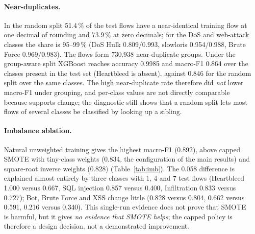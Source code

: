 \documentclass[11pt,a4paper]{article}
\begin{document}
\paragraph{Near-duplicates.} In the random split 51.4\,\% of the test flows have a near-identical training flow at one decimal of rounding and 73.9\,\% at zero decimals; for the DoS and web-attack classes the share is 95--99\,\% (DoS Hulk 0.809/0.993, slowloris 0.954/0.988, Brute Force 0.969/0.983). The flows form 730{,}938 near-duplicate groups. Under the group-aware split XGBoost reaches accuracy 0.9985 and macro-F1 0.864 over the classes present in the test set (Heartbleed is absent), against 0.846 for the random split over the same classes. The high near-duplicate rate therefore did \emph{not} lower macro-F1 under grouping, and per-class values are not directly comparable because supports change; the diagnostic still shows that a random split lets most flows of several classes be classified by looking up a sibling.

\paragraph{Imbalance ablation.} Natural unweighted training gives the highest macro-F1 (0.892), above capped SMOTE with tiny-class weights (0.834, the configuration of the main results) and square-root inverse weights (0.828) (Table~\ref{tab:imb}). The 0.058 difference is explained almost entirely by three classes with 1, 4 and 7 test flows (Heartbleed 1.000 versus 0.667, SQL injection 0.857 versus 0.400, Infiltration 0.833 versus 0.727); Bot, Brute Force and XSS change little (0.828 versus 0.804, 0.662 versus 0.591, 0.216 versus 0.340). This single-run evidence does not prove that SMOTE is harmful, but it gives \emph{no evidence that SMOTE helps}; the capped policy is therefore a design decision, not a demonstrated improvement.

\begin{table}[tbp]
\centering
\caption{Imbalance ablation (XGBoost, random split, one run); only the training-set treatment differs.}
\label{tab:imb}
\small
{}
\end{table}
\end{document}
